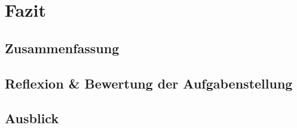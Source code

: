 \section{Fazit}
\blindtext[1]
	\subsection{Zusammenfassung}
	\blindtext[2]
	\subsection{Reflexion \& Bewertung der Aufgabenstellung}
	\blindtext[2]
	\subsection{Ausblick}
	\blindtext[4]